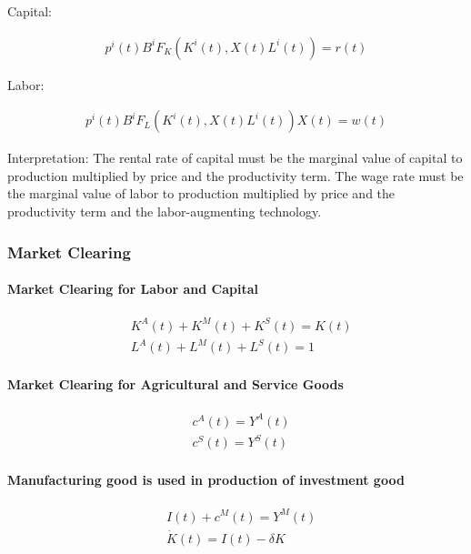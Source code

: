 \documentclass[10pt]{article}
\begin{document}
Capital:

\begin{align}
    p^i(t) B^i F_K\left(K^i(t), X(t) L^i(t)\right)=r(t) \label{eq:l2_firm_capital_optimality}
\end{align}

Labor:

\begin{align}
    p^i(t) B^i F_L\left(K^i(t), X(t) L^i(t)\right) X(t)=w(t) \label{eq:l2_firm_labor_optimality}
\end{align}

Interpretation: 
The rental rate of capital must be the marginal value 
of capital to production multiplied by price 
and the productivity term. 
The wage rate must be the 
marginal value of labor to production multiplied by price 
and the productivity term and the labor-augmenting 
technology. 


\subsubsection{Market Clearing}

\paragraph{Market Clearing for Labor and Capital}

\begin{align}
    &K^A(t)+K^M(t)+K^S(t)=K(t) \\
    &L^A(t)+L^M(t)+L^S(t)=1
\end{align}

\paragraph{Market Clearing for Agricultural and Service Goods}

\begin{align}
    &c^A(t)=Y^A(t) \\
    &c^S(t)=Y^S(t)
\end{align}

\paragraph{Manufacturing good is used in production of investment good}

\begin{align}
    &I(t)+c^M(t) =Y^M(t) \\ 
    &\dot{K}(t) =I(t)-\delta K
\end{align}
\end{document}
